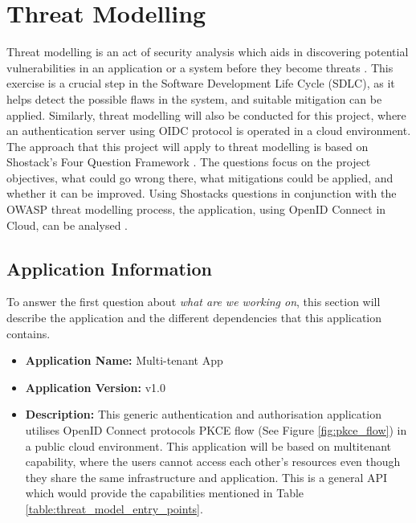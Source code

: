 \chapter{Threat Modelling}

Threat modelling is an act of security analysis which aids in discovering potential vulnerabilities in an application or a system before they become threats \citep{threat_model_intro}. This exercise is a crucial step in the Software Development Life Cycle (SDLC), as it helps detect the possible flaws in the system, and suitable mitigation can be applied. Similarly, threat modelling will also be conducted for this project, where an authentication server using OIDC protocol is operated in a cloud environment. The approach that this project will apply to threat modelling is based on Shostack's Four Question Framework \citep{shostack}. The questions focus on the project objectives, what could go wrong there, what mitigations could be applied, and whether it can be improved. Using Shostacks questions in conjunction with the OWASP threat modelling process, the application, using OpenID Connect in Cloud, can be analysed \citep{owasp_threat_model}. 


\section{Application Information}
To answer the first question about \textit{what are we working on}, this section will describe the application and the different dependencies that this application contains.
\begin{itemize}
    \item \textbf{Application Name:} Multi-tenant App
    \item \textbf{Application Version:} v1.0
    \item \textbf{Description:} This generic authentication and authorisation application utilises OpenID Connect protocols PKCE flow (See Figure \ref{fig:pkce_flow}) in a public cloud environment. This application will be based on multitenant capability, where the users cannot access each other's resources even though they share the same infrastructure and application. This is a general API which would provide the capabilities mentioned in Table \ref{table:threat_model_entry_points}.
  \end{itemize}

